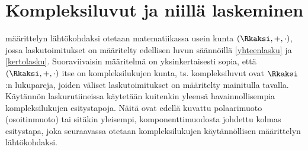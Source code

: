 \section{Kompleksiluvut ja niillä laskeminen} 
\label{kompleksiluvuilla laskeminen}
\alku
{}

 määrittelyn lähtökohdaksi otetaan matematiikassa usein kunta 
$(\Rkaksi,+,\cdot)$, jossa laskutoimitukset on määritelty edellisen luvun säännöillä 
\eqref{yhteenlasku} ja \eqref{kertolasku}. Suoraviivaisin määritelmä on yksinkertaisesti sopia,
että $(\Rkaksi,+,\cdot)$ itse on kompleksilukujen kunta, ts. kompleksiluvut ovat $\Rkaksi$:n 
lukupareja, joiden väliset laskutoimitukset on määritelty mainitulla tavalla. Käytännön 
laskurutiineissa käytetään kuitenkin yleensä havainnollisempia kompleksilukujen esitystapoja. 
Näitä ovat edellä kuvattu polaarimuoto (osoitinmuoto) tai sitäkin yleisempi,
komponenttimuodosta johdettu kolmas esitystapa, joka seuraavassa otetaan kompleksilukujen
käytännöllisen määrittelyn lähtökohdaksi.

